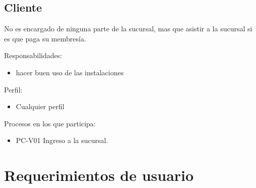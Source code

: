 \begin{Usuario}{\subsection{Cliente}}{
		No es encargado de ninguna parte de la sucursal, mas que asistir a la sucursal si es que paga su membresía.
	}
			\item[Responsabilidades:] \cdtEmpty
		\begin{itemize}
			\item hacer buen uso de las instalaciones
		\end{itemize}
		
		\item[Perfil:] \cdtEmpty
		\begin{itemize}
			\item Cualquier perfil
		\end{itemize}
		\item[Procesos en los que participa:] \cdtEmpty
		\begin{itemize}
			\item PC-V01 Ingreso a la sucursal.
			
		\end{itemize}

\end{Usuario}


\section{Requerimientos de usuario}



